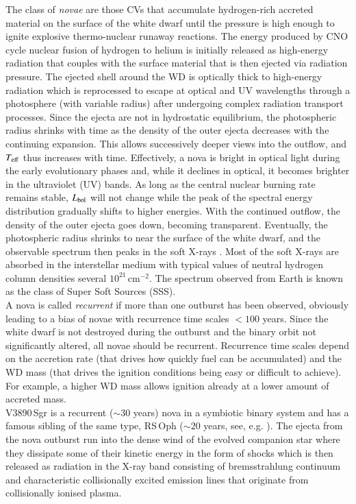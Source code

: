 \documentclass{aa}
\begin{document}
The class of {\em novae} are those CVs that accumulate hydrogen-rich
accreted material on the surface of the white dwarf until the pressure
is high enough to ignite explosive thermo-nuclear runaway
reactions. The energy produced by CNO cycle nuclear fusion of hydrogen
to helium is initially released as high-energy radiation that couples
with the surface material that is then ejected via radiation pressure.
The ejected shell around the WD is optically thick to high-energy
radiation which is reprocessed to escape at optical and UV wavelengths
through a photosphere (with variable radius) after undergoing complex
radiation transport processes. Since the ejecta are not in hydrostatic
equilibrium, the photospheric radius shrinks with time as the density
of the outer ejecta decreases with the continuing expansion. This
allows successively deeper views into the outflow, and $T_{\rm eff}$
thus increases with time. Effectively, a nova is bright
in optical light during the early evolutionary phases and, while it
declines in optical, it becomes brighter in the ultraviolet (UV) bands.
As long as the central nuclear burning rate remains stable, $L_{\rm bol}$
will not change while the peak of the spectral energy
distribution gradually shifts to higher energies. With the continued
outflow, the density of the outer ejecta goes down, becoming
transparent. Eventually, the photospheric radius shrinks to near the
surface of the white dwarf, and the observable spectrum then peaks in
the soft X-rays \citep[e.g.,][]{st08}. Most of the soft X-rays are
absorbed in the interstellar medium with typical values of neutral
hydrogen column densities several $10^{21}$\,cm$^{-2}$. The spectrum
observed from Earth is known as the class of Super Soft Sources (SSS).\\

A nova is called {\em recurrent} if more than one outburst has been observed,
obviously leading to a bias of novae with recurrence time scales
$<100$ years. Since the white dwarf is not destroyed during the outburst
and the binary orbit not significantly altered, all novae should be
recurrent. Recurrence time scales depend on the accretion rate (that
drives how quickly fuel can be accumulated) and the WD mass (that
drives the ignition conditions being easy or difficult to achieve).
For example, a higher WD mass allows ignition already at a lower amount
of accreted mass.\\

V3890\,Sgr is a recurrent ($\sim 30$ years) nova in a symbiotic binary
system and has a famous sibling of the same type, RS\,Oph ($\sim 20$
years, see, e.g. \citealt{nessrsoph}). The ejecta from the nova outburst
run into the dense wind of the evolved companion star where they dissipate
some of their kinetic energy in the form of shocks which is then released
as radiation in the X-ray band consisting of bremsstrahlung continuum
and characteristic collisionally excited emission lines that originate
from collisionally ionised plasma.\\
\end{document}
